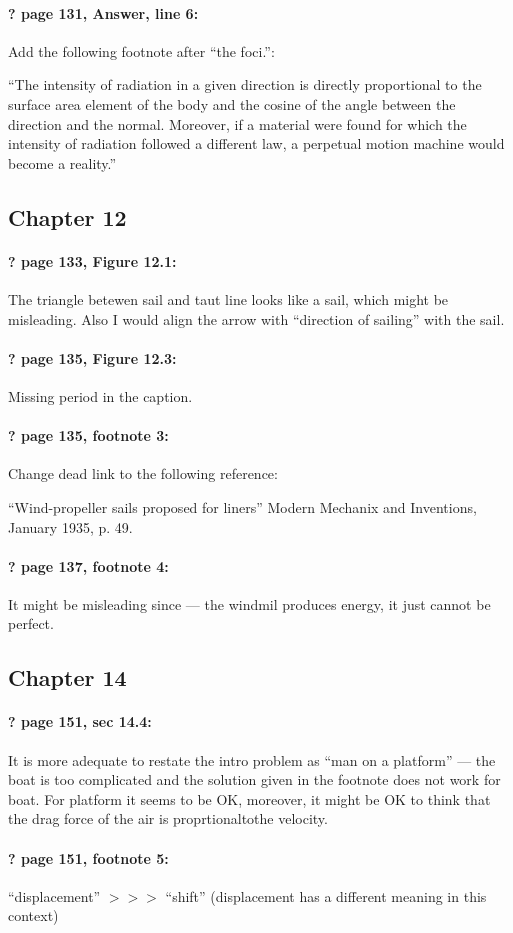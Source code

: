 \documentclass[twoside]{article}
\begin{document}
\paragraph{? page 131, Answer, line 6:} Add the following footnote after ``the foci.'':

``The intensity of radiation in a given direction is directly proportional to the surface area element of the body and the cosine of the angle between the direction and the normal. Moreover, if a material were found for which the intensity of radiation followed a different law, a perpetual motion machine would become a reality.''

\subsection*{Chapter 12}

\paragraph{? page 133, Figure 12.1:} The triangle betewen sail and taut line looks like a sail, which might be misleading. Also I would align the arrow with ``direction of sailing'' with the sail.

\paragraph{? page 135, Figure 12.3:} Missing period in the caption.

\paragraph{? page 135, footnote 3:} Change dead link to the following reference:

``Wind-propeller sails proposed for liners'' Modern Mechanix and Inventions, January 1935, p. 49.

\paragraph{? page 137, footnote 4:} It might be misleading since --- the windmil produces energy, it just cannot be perfect.

\subsection*{Chapter 14}

\paragraph{? page 151, sec 14.4:} It is more adequate to restate the intro problem as ``man on a platform'' --- the boat is too complicated and the solution given in the footnote does not work for boat. For platform it seems to be OK, moreover, it might be OK to think that the drag force of the air is proprtionaltothe velocity.

\paragraph{? page 151, footnote 5:}  ``displacement'' $>\!>\!>$ ``shift'' (displacement has a different meaning in this context)
\end{document}
